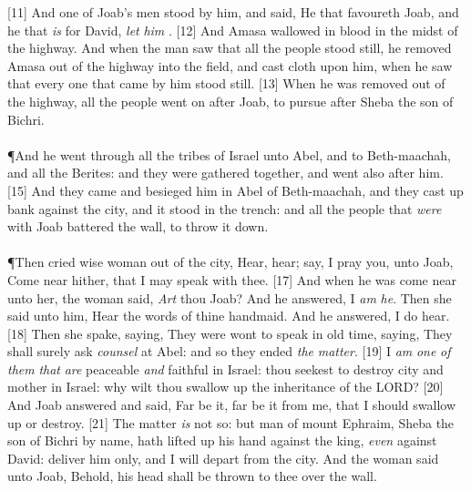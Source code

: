 [11] \textcolor[cmyk]{0.99998,1,0,0}{And one of Joab's men stood by him, and said, He that favoureth Joab, and he that \emph{is} for David, \emph{let} \emph{him} .}
[12] \textcolor[cmyk]{0.99998,1,0,0}{And Amasa wallowed in blood in the midst of the highway. And when the man saw that all the people stood still, he removed Amasa out of the highway into the field, and cast  cloth upon him, when he saw that every one that came by him stood still.}
[13] \textcolor[cmyk]{0.99998,1,0,0}{When he was removed out of the highway, all the people went on after Joab, to pursue after Sheba the son of Bichri.}\\
\\
\P \textcolor[cmyk]{0.99998,1,0,0}{And he went through all the tribes of Israel unto Abel, and to Beth-maachah, and all the Berites: and they were gathered together, and went also after him.}
[15] \textcolor[cmyk]{0.99998,1,0,0}{And they came and besieged him in Abel of Beth-maachah, and they cast up  bank against the city, and it stood in the trench: and all the people that \emph{were} with Joab battered the wall, to throw it down.}\\
\\
\P \textcolor[cmyk]{0.99998,1,0,0}{Then cried  wise woman out of the city, Hear, hear; say, I pray you, unto Joab, Come near hither, that I may speak with thee.}
[17] \textcolor[cmyk]{0.99998,1,0,0}{And when he was come near unto her, the woman said, \emph{Art} thou Joab? And he answered, I \emph{am} \emph{he}. Then she said unto him, Hear the words of thine handmaid. And he answered, I do hear.}
[18] \textcolor[cmyk]{0.99998,1,0,0}{Then she spake, saying, They were wont to speak in old time, saying, They shall surely ask \emph{counsel} at Abel: and so they ended \emph{the} \emph{matter}.}
[19] \textcolor[cmyk]{0.99998,1,0,0}{I \emph{am} \emph{one} \emph{of} \emph{them} \emph{that} \emph{are} peaceable \emph{and} faithful in Israel: thou seekest to destroy  city and  mother in Israel: why wilt thou swallow up the inheritance of the LORD?}
[20] \textcolor[cmyk]{0.99998,1,0,0}{And Joab answered and said, Far be it, far be it from me, that I should swallow up or destroy.}
[21] \textcolor[cmyk]{0.99998,1,0,0}{The matter \emph{is} not so: but  man of mount Ephraim, Sheba the son of Bichri by name, hath lifted up his hand against the king, \emph{even} against David: deliver him only, and I will depart from the city. And the woman said unto Joab, Behold, his head shall be thrown to thee over the wall.}
